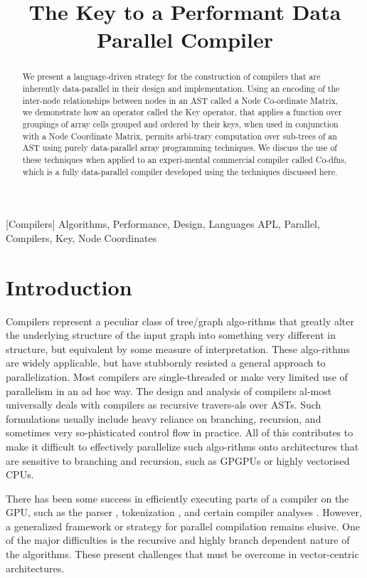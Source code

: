 ﻿\documentclass[numbers,10pt,preprint]{sigplanconf}
\begin{document}
\title{The Key to a Performant Data Parallel Compiler}
\maketitle

\begin{abstract}
We present a language-driven strategy for the construction of compilers that are inherently data-parallel in their design and implementation. Using an encoding of the inter-node relationships between nodes in an AST called a Node Co-ordinate Matrix, we demonstrate how an operator called the Key operator, that applies a function over groupings of array cells grouped and ordered by their keys, when used in conjunction with a Node Coordinate Matrix, permits arbi-trary computation over sub-trees of an AST using purely data-parallel array programming techniques. We discuss the use of these techniques when applied to an experi-mental commercial compiler called Co-dfns, which is a fully data-parallel compiler developed using the techniques discussed here.
\end{abstract}

[Compilers]
\terms Algorithms, Performance, Design, Languages
\keywords APL, Parallel, Compilers, Key, Node Coordinates

\section{Introduction}

Compilers represent a peculiar class of tree/graph algo-rithms that greatly alter the underlying structure of the input graph into something very different in structure, but equivalent by some measure of interpretation. These algo-rithms are widely applicable, but have stubbornly resisted a general approach to parallelization. Most compilers are single-threaded or make very limited use of parallelism in an ad hoc way. The design and analysis of compilers al-most universally deals with compilers as recursive travers-als over ASTs. Such formulations usually include heavy reliance on branching, recursion, and sometimes very so-phisticated control flow in practice. All of this contributes to make it difficult to effectively parallelize such algo-rithms onto architectures that are sensitive to branching and recursion, such as GPGPUs or highly vectorised CPUs.

There has been some success in efficiently executing parts of a compiler on the GPU, such as the parser \cite{bunda1984apl}, tokenization \cite{bernecky2003tokenizer}, and certain compiler analyses \cite{prabhu2011eigencfa,mendez2012inclusion}. However, a generalized framework or strategy for parallel compilation remains elusive. One of the major difficulties is the recursive and highly branch dependent nature of the algorithms. These present challenges that must be overcome in vector-centric architectures.
\end{document}

